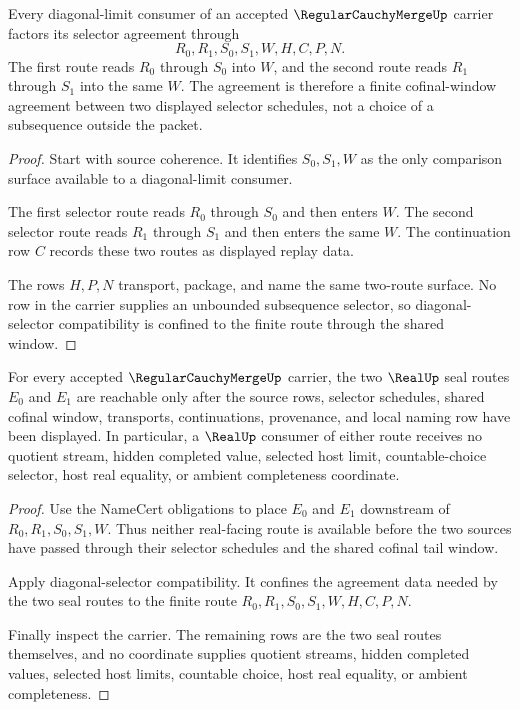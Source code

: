 \begin{theorem}
\label{thm:regular-cauchy-merge-diagonal-selector-compatibility}
Every diagonal-limit consumer of an accepted $\RegularCauchyMergeUp$ carrier factors its selector agreement through
$$
R_0,R_1,S_0,S_1,W,H,C,P,N.
$$
The first route reads $R_0$ through $S_0$ into $W$, and the second route reads $R_1$ through $S_1$ into the same $W$. The agreement is therefore a finite cofinal-window agreement between two displayed selector schedules, not a choice of a subsequence outside the packet.
\end{theorem}
\begin{proof}
Start with source coherence. It identifies $S_0,S_1,W$ as the only comparison surface available to a diagonal-limit consumer.

The first selector route reads $R_0$ through $S_0$ and then enters $W$. The second selector route reads $R_1$ through $S_1$ and then enters the same $W$. The continuation row $C$ records these two routes as displayed replay data.

The rows $H,P,N$ transport, package, and name the same two-route surface. No row in the carrier supplies an unbounded subsequence selector, so diagonal-selector compatibility is confined to the finite route through the shared window.
\end{proof}

\begin{theorem}
\label{thm:regular-cauchy-merge-real-seal-nonescape}
For every accepted $\RegularCauchyMergeUp$ carrier, the two $\RealUp$ seal routes $E_0$ and $E_1$ are reachable only after the source rows, selector schedules, shared cofinal window, transports, continuations, provenance, and local naming row have been displayed. In particular, a $\RealUp$ consumer of either route receives no quotient stream, hidden completed value, selected host limit, countable-choice selector, host real equality, or ambient completeness coordinate.
\end{theorem}
\begin{proof}
Use the NameCert obligations to place $E_0$ and $E_1$ downstream of $R_0,R_1,S_0,S_1,W$. Thus neither real-facing route is available before the two sources have passed through their selector schedules and the shared cofinal tail window.

Apply diagonal-selector compatibility. It confines the agreement data needed by the two seal routes to the finite route $R_0,R_1,S_0,S_1,W,H,C,P,N$.

Finally inspect the carrier. The remaining rows are the two seal routes themselves, and no coordinate supplies quotient streams, hidden completed values, selected host limits, countable choice, host real equality, or ambient completeness.
\end{proof}

